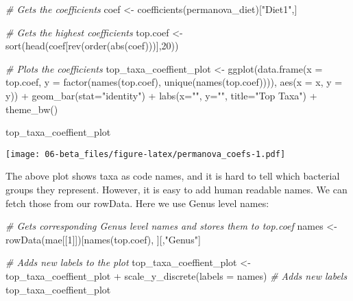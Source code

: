 \documentclass[
  oneside]{book}
\newenvironment{Shaded}{\begin{snugshade}}{\end{snugshade}}
\newcommand{\AttributeTok}[1]{\textcolor[rgb]{0.77,0.63,0.00}{#1}}
\newcommand{\CommentTok}[1]{\textcolor[rgb]{0.56,0.35,0.01}{\textit{#1}}}
\newcommand{\DecValTok}[1]{\textcolor[rgb]{0.00,0.00,0.81}{#1}}
\newcommand{\FunctionTok}[1]{\textcolor[rgb]{0.00,0.00,0.00}{#1}}
\newcommand{\NormalTok}[1]{#1}
\newcommand{\OtherTok}[1]{\textcolor[rgb]{0.56,0.35,0.01}{#1}}
\newcommand{\SpecialCharTok}[1]{\textcolor[rgb]{0.00,0.00,0.00}{#1}}
\newcommand{\StringTok}[1]{\textcolor[rgb]{0.31,0.60,0.02}{#1}}
\begin{document}
\begin{Shaded}
\begin{Highlighting}[]
\CommentTok{\# Gets the coefficients}
\NormalTok{coef }\OtherTok{\textless{}{-}} \FunctionTok{coefficients}\NormalTok{(permanova\_diet)[}\StringTok{"Diet1"}\NormalTok{,]}

\CommentTok{\# Gets the highest coefficients}
\NormalTok{top.coef }\OtherTok{\textless{}{-}} \FunctionTok{sort}\NormalTok{(}\FunctionTok{head}\NormalTok{(coef[}\FunctionTok{rev}\NormalTok{(}\FunctionTok{order}\NormalTok{(}\FunctionTok{abs}\NormalTok{(coef)))],}\DecValTok{20}\NormalTok{))}

\CommentTok{\# Plots the coefficients}
\NormalTok{top\_taxa\_coeffient\_plot }\OtherTok{\textless{}{-}} \FunctionTok{ggplot}\NormalTok{(}\FunctionTok{data.frame}\NormalTok{(}\AttributeTok{x =}\NormalTok{ top.coef,}
                                             \AttributeTok{y =} \FunctionTok{factor}\NormalTok{(}\FunctionTok{names}\NormalTok{(top.coef),}
                         \FunctionTok{unique}\NormalTok{(}\FunctionTok{names}\NormalTok{(top.coef)))),}
                                  \FunctionTok{aes}\NormalTok{(}\AttributeTok{x =}\NormalTok{ x, }\AttributeTok{y =}\NormalTok{ y)) }\SpecialCharTok{+}
  \FunctionTok{geom\_bar}\NormalTok{(}\AttributeTok{stat=}\StringTok{"identity"}\NormalTok{) }\SpecialCharTok{+}
  \FunctionTok{labs}\NormalTok{(}\AttributeTok{x=}\StringTok{""}\NormalTok{, }\AttributeTok{y=}\StringTok{""}\NormalTok{, }\AttributeTok{title=}\StringTok{"Top Taxa"}\NormalTok{) }\SpecialCharTok{+}
  \FunctionTok{theme\_bw}\NormalTok{()}

\NormalTok{top\_taxa\_coeffient\_plot}
\end{Highlighting}
\end{Shaded}

\texttt{[image: 06-beta\_files/figure-latex/permanova\_coefs-1.pdf]}

The above plot shows taxa as code names, and it is hard to tell which
bacterial groups they represent. However, it is easy to add human readable
names. We can fetch those from our rowData. Here we use Genus level names:

\begin{Shaded}
\begin{Highlighting}[]
\CommentTok{\# Gets corresponding Genus level names and stores them to top.coef}
\NormalTok{names }\OtherTok{\textless{}{-}} \FunctionTok{rowData}\NormalTok{(mae[[}\DecValTok{1}\NormalTok{]])[}\FunctionTok{names}\NormalTok{(top.coef), ][,}\StringTok{"Genus"}\NormalTok{]}

\CommentTok{\# Adds new labels to the plot}
\NormalTok{top\_taxa\_coeffient\_plot }\OtherTok{\textless{}{-}}\NormalTok{ top\_taxa\_coeffient\_plot }\SpecialCharTok{+}
  \FunctionTok{scale\_y\_discrete}\NormalTok{(}\AttributeTok{labels =}\NormalTok{ names) }\CommentTok{\# Adds new labels}
\NormalTok{top\_taxa\_coeffient\_plot}
\end{Highlighting}
\end{Shaded}
\end{document}
